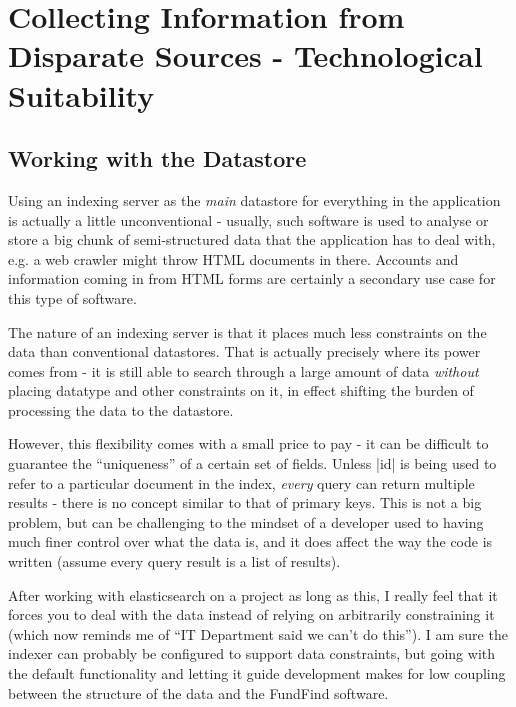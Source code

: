\section{Collecting Information from Disparate Sources - Technological Suitability}

\subsection{Working with the Datastore}
\label{eval-datastore}
Using an indexing server as the \emph{main} datastore for everything in the application is actually a little unconventional - usually, such software is used to analyse or store a big chunk of semi-structured data that the application has to deal with, e.g. a web crawler might throw HTML documents in there. Accounts and information coming in from HTML forms are certainly a secondary use case for this type of software.

The nature of an indexing server is that it places much less constraints on the data than conventional datastores. That is actually precisely where its power comes from - it is still able to search through a large amount of data \emph{without} placing datatype and other constraints on it, in effect shifting the burden of processing the data to the datastore.

However, this flexibility comes with a small price to pay - it can be difficult to guarantee the ``uniqueness'' of a certain set of fields. Unless |id| is being used to refer to a particular document in the index, \emph{every} query can return multiple results - there is no concept similar to that of primary keys. This is not a big problem, but can be challenging to the mindset of a developer used to having much finer control over what the data is, and it does affect the way the code is written (assume every query result is a list of results).

After working with elasticsearch on a project as long as this, I really feel that it forces you to deal with the data instead of relying on arbitrarily constraining it (which now reminds me of ``IT Department said we can't do this''). I am sure the indexer can probably be configured to support data constraints, but going with the default functionality and letting it guide development makes for low coupling between the structure of the data and the FundFind software.

